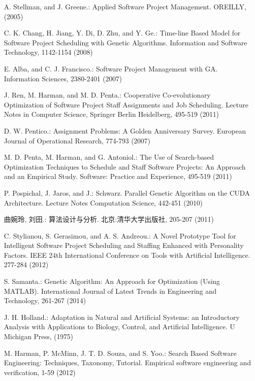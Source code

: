 %
%
\begin{thebibliography}{}
%
A. Stellman, and J. Greene.:
Applied Software Project Management.
OREILLY, (2005)

C. K. Chang, H. Jiang, Y. Di, D. Zhu, and Y. Ge.:
Time-line Based Model for Software Project Scheduling with Genetic Algorithms.
Information and Software Technology, 1142-1154 (2008)

E. Alba, and C. J. Francisco.:
Software Project Management with GA.
Information Sciences, 2380-2401 (2007)

J. Ren, M. Harman, and M. D. Penta.:
Cooperative Co-evolutionary Optimization of Software Project Staff Assignments and Job Scheduling.
Lecture Notes in Computer Science, Springer Berlin Heidelberg, 495-519 (2011)

D. W. Pentico.:
Assignment Problems: A Golden Anniversary Survey.
European Journal of Operational Research, 774-793 (2007)

M. D. Penta, M. Harman, and G. Antoniol.:
The Use of Search-based Optimization Techniques to Schedule and Staff Software Projects: An Approach and an Empirical Study. 
Software: Practice and Experience, 495-519 (2011)

P. Pospichal, J. Jaros, and J.:
Schwarz. Parallel Genetic Algorithm on the CUDA Architecture.
Lecture Notes Computation Science, 442-451 (2010)

曲婉玲, 刘田.:
算法设计与分析.
北京:清华大学出版社, 205-207 (2011)

C. Stylianou, S. Gerasimou, and A. S. Andreou.:
A Novel Prototype Tool for Intelligent Software Project Scheduling and Staffing Enhanced with Personality Factors.
IEEE 24th International Conference on Tools with Artificial Intelligence. 277-284 (2012)

S. Samanta.:
Genetic Algorithm: An Approach for Optimization (Using MATLAB). 
International Journal of Latest Trends in Engineering and Technology, 261-267 (2014)

J. H. Holland.:
Adaptation in Natural and Artificial Systems: an Introductory Analysis with Applications to Biology, Control, and Artificial Intelligence.
U Michigan Press, (1975)

M. Harman, P. McMinn, J. T. D. Souza, and S. Yoo.:
Search Based Software Engineering: Techniques, Taxonomy, Tutorial.
Empirical software engineering and verification, 1-59 (2012)


\end{thebibliography}
